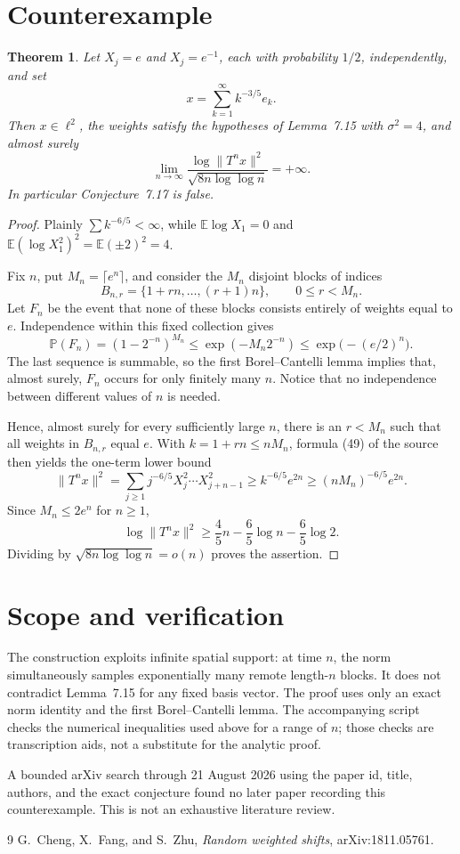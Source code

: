 \documentclass[11pt]{article}
\newtheorem{theorem}{Theorem}
\newcommand{\E}{\mathbb E}
\newcommand{\Pp}{\mathbb P}
\begin{document}
\section{Counterexample}
\begin{theorem}
Let \(X_j=e\) and \(X_j=e^{-1}\), each with probability \(1/2\), independently,
and set
\[
 x=\sum_{k=1}^{\infty}k^{-3/5}e_k.
\]
Then \(x\in\ell^2\), the weights satisfy the hypotheses of Lemma~7.15 with
\(\sigma^2=4\), and almost surely
\[
 \lim_{n\to\infty}\frac{\log\|T^n x\|^2}{\sqrt{8n\log\log n}}=+\infty.
\]
In particular Conjecture~7.17 is false.
\end{theorem}

\begin{proof}
Plainly \(\sum k^{-6/5}<\infty\), while
\(\E\log X_1=0\) and
\(\E(\log X_1^2)^2=\E(\pm2)^2=4\).

Fix \(n\), put \(M_n=\lceil e^n\rceil\), and consider the \(M_n\) disjoint
blocks of indices
\[
 B_{n,r}=\{1+rn,\ldots,(r+1)n\},\qquad 0\le r<M_n.
\]
Let \(F_n\) be the event that none of these blocks consists entirely of
weights equal to \(e\).  Independence within this fixed collection gives
\[
 \Pp(F_n)=(1-2^{-n})^{M_n}
 \le \exp(-M_n2^{-n})
 \le \exp\bigl(-(e/2)^n\bigr).
\]
The last sequence is summable, so the first Borel--Cantelli lemma implies
that, almost surely, \(F_n\) occurs for only finitely many \(n\).  Notice that
no independence between different values of \(n\) is needed.

Hence, almost surely for every sufficiently large \(n\), there is an
\(r<M_n\) such that all weights in \(B_{n,r}\) equal \(e\).  With
\(k=1+rn\le nM_n\), formula (49) of the source then yields the one-term
lower bound
\[
 \|T^n x\|^2
 =\sum_{j\ge1}j^{-6/5}X_j^2\cdots X_{j+n-1}^2
 \ge k^{-6/5}e^{2n}
 \ge (nM_n)^{-6/5}e^{2n}.
\]
Since \(M_n\le2e^n\) for \(n\ge1\),
\[
 \log\|T^n x\|^2
 \ge \frac45n-\frac65\log n-\frac65\log2.
\]
Dividing by \(\sqrt{8n\log\log n}=o(n)\) proves the assertion.
\end{proof}

\section{Scope and verification}
The construction exploits infinite spatial support: at time \(n\), the norm
simultaneously samples exponentially many remote length-\(n\) blocks.  It
does not contradict Lemma~7.15 for any fixed basis vector.  The proof uses
only an exact norm identity and the first Borel--Cantelli lemma.  The
accompanying script checks the numerical inequalities used above for a
range of \(n\); those checks are transcription aids, not a substitute for
the analytic proof.

A bounded arXiv search through 21 August 2026 using the paper id, title,
authors, and the exact conjecture found no later paper recording this
counterexample.  This is not an exhaustive literature review.

\begin{thebibliography}{9}
 G.~Cheng, X.~Fang, and S.~Zhu,
\emph{Random weighted shifts}, arXiv:1811.05761.
\end{thebibliography}
\end{document}
